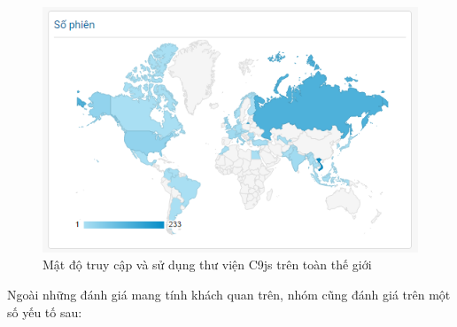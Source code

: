 \documentclass[12pt,a4paper,twoside]{article}
\begin{document}
\begin{figure}[!h]
	\begin{center}
    \includegraphics[scale=1]{image/ga_map}
    \caption{Mật độ truy cập và sử dụng thư viện C9js trên toàn thế giới}
    \label{fig:ga_map}
	\end{center}
\end{figure}
Ngoài những đánh giá mang tính khách quan trên, nhóm cũng đánh giá trên một số yếu tố sau:
\end{document}
